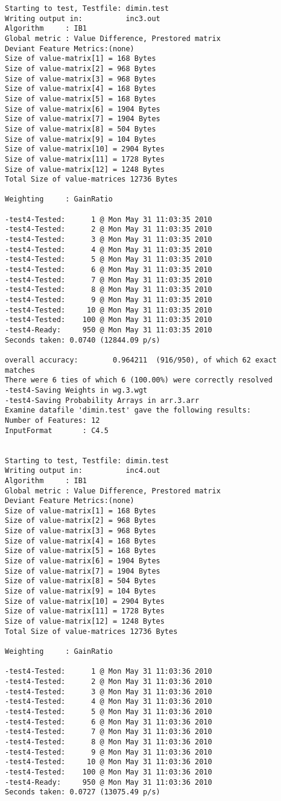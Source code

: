 \documentclass{report}
\begin{document}
\begin{footnotesize}
\begin{verbatim}
Starting to test, Testfile: dimin.test
Writing output in:          inc3.out
Algorithm     : IB1
Global metric : Value Difference, Prestored matrix
Deviant Feature Metrics:(none)
Size of value-matrix[1] = 168 Bytes 
Size of value-matrix[2] = 968 Bytes 
Size of value-matrix[3] = 968 Bytes 
Size of value-matrix[4] = 168 Bytes 
Size of value-matrix[5] = 168 Bytes 
Size of value-matrix[6] = 1904 Bytes 
Size of value-matrix[7] = 1904 Bytes 
Size of value-matrix[8] = 504 Bytes 
Size of value-matrix[9] = 104 Bytes 
Size of value-matrix[10] = 2904 Bytes 
Size of value-matrix[11] = 1728 Bytes 
Size of value-matrix[12] = 1248 Bytes 
Total Size of value-matrices 12736 Bytes 

Weighting     : GainRatio

-test4-Tested:      1 @ Mon May 31 11:03:35 2010
-test4-Tested:      2 @ Mon May 31 11:03:35 2010
-test4-Tested:      3 @ Mon May 31 11:03:35 2010
-test4-Tested:      4 @ Mon May 31 11:03:35 2010
-test4-Tested:      5 @ Mon May 31 11:03:35 2010
-test4-Tested:      6 @ Mon May 31 11:03:35 2010
-test4-Tested:      7 @ Mon May 31 11:03:35 2010
-test4-Tested:      8 @ Mon May 31 11:03:35 2010
-test4-Tested:      9 @ Mon May 31 11:03:35 2010
-test4-Tested:     10 @ Mon May 31 11:03:35 2010
-test4-Tested:    100 @ Mon May 31 11:03:35 2010
-test4-Ready:     950 @ Mon May 31 11:03:35 2010
Seconds taken: 0.0740 (12844.09 p/s)

overall accuracy:        0.964211  (916/950), of which 62 exact matches 
There were 6 ties of which 6 (100.00%) were correctly resolved
-test4-Saving Weights in wg.3.wgt
-test4-Saving Probability Arrays in arr.3.arr
Examine datafile 'dimin.test' gave the following results:
Number of Features: 12
InputFormat       : C4.5


Starting to test, Testfile: dimin.test
Writing output in:          inc4.out
Algorithm     : IB1
Global metric : Value Difference, Prestored matrix
Deviant Feature Metrics:(none)
Size of value-matrix[1] = 168 Bytes 
Size of value-matrix[2] = 968 Bytes 
Size of value-matrix[3] = 968 Bytes 
Size of value-matrix[4] = 168 Bytes 
Size of value-matrix[5] = 168 Bytes 
Size of value-matrix[6] = 1904 Bytes 
Size of value-matrix[7] = 1904 Bytes 
Size of value-matrix[8] = 504 Bytes 
Size of value-matrix[9] = 104 Bytes 
Size of value-matrix[10] = 2904 Bytes 
Size of value-matrix[11] = 1728 Bytes 
Size of value-matrix[12] = 1248 Bytes 
Total Size of value-matrices 12736 Bytes 

Weighting     : GainRatio

-test4-Tested:      1 @ Mon May 31 11:03:36 2010
-test4-Tested:      2 @ Mon May 31 11:03:36 2010
-test4-Tested:      3 @ Mon May 31 11:03:36 2010
-test4-Tested:      4 @ Mon May 31 11:03:36 2010
-test4-Tested:      5 @ Mon May 31 11:03:36 2010
-test4-Tested:      6 @ Mon May 31 11:03:36 2010
-test4-Tested:      7 @ Mon May 31 11:03:36 2010
-test4-Tested:      8 @ Mon May 31 11:03:36 2010
-test4-Tested:      9 @ Mon May 31 11:03:36 2010
-test4-Tested:     10 @ Mon May 31 11:03:36 2010
-test4-Tested:    100 @ Mon May 31 11:03:36 2010
-test4-Ready:     950 @ Mon May 31 11:03:36 2010
Seconds taken: 0.0727 (13075.49 p/s)


\end{verbatim}
\end{footnotesize}
\end{document}
